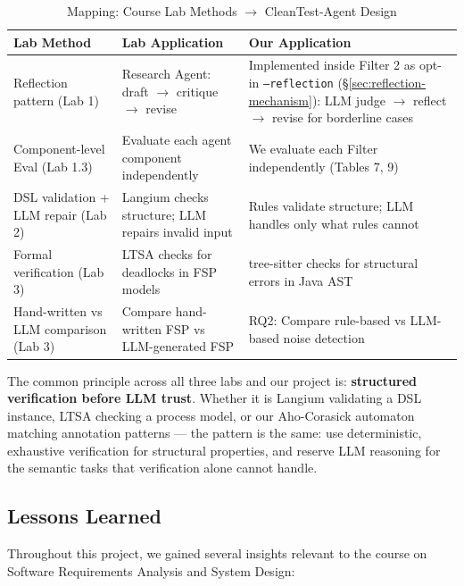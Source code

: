 \documentclass[acmlarge,nonacm,screen]{acmart}
\begin{document}
\begin{table}[htbp]
\caption{Mapping: Course Lab Methods $\to$ CleanTest-Agent Design}
\label{tab:course-mapping}
\begin{tabular}{@{}p{3.5cm}p{3.5cm}p{4cm}@{}}
\toprule
\textbf{Lab Method} & \textbf{Lab Application} & \textbf{Our Application} \\
\midrule
Reflection pattern (Lab 1) & Research Agent: draft $\to$ critique $\to$ revise & Implemented inside Filter 2 as opt-in \texttt{--reflection} (\S\ref{sec:reflection-mechanism}): LLM judge $\to$ reflect $\to$ revise for borderline cases \\
Component-level Eval (Lab 1.3) & Evaluate each agent component independently & We evaluate each Filter independently (Tables 7, 9) \\
DSL validation + LLM repair (Lab 2) & Langium checks structure; LLM repairs invalid input & Rules validate structure; LLM handles only what rules cannot \\
Formal verification (Lab 3) & LTSA checks for deadlocks in FSP models & tree-sitter checks for structural errors in Java AST \\
Hand-written vs LLM comparison (Lab 3) & Compare hand-written FSP vs LLM-generated FSP & RQ2: Compare rule-based vs LLM-based noise detection \\
\bottomrule
\end{tabular}
\end{table}

The common principle across all three labs and our project is: \textbf{structured verification before LLM trust}. Whether it is Langium validating a DSL instance, LTSA checking a process model, or our Aho-Corasick automaton matching annotation patterns --- the pattern is the same: use deterministic, exhaustive verification for structural properties, and reserve LLM reasoning for the semantic tasks that verification alone cannot handle.

\subsection{Lessons Learned}

Throughout this project, we gained several insights relevant to the course on Software Requirements Analysis and System Design:
\end{document}
